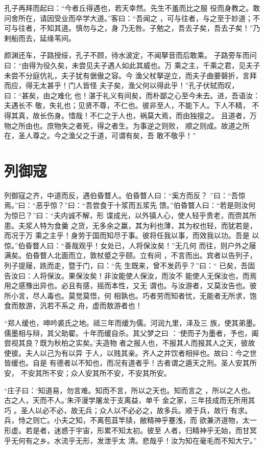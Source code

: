 \documentclass[12pt,UTF8]{ctexbook}
\begin{document}
孔子再拜而起曰：“今者丘得遇也，若天幸然。先生不羞而比之服 役而身教之。敢问舍所在，请因受业而卒学大道。”客曰：“吾闻之 ，可与往者，与之至于妙道；不可与往者，不知其道。慎勿与之，身 乃无咎。子勉之，吾去子矣，吾去子矣！”乃剌船而去，延缘苇间。

颜渊还车，子路授绥，孔子不顾，待水波定，不闻拏音而后敢乘。 子路旁车而问曰：“由得为役久矣，未尝见夫子遇人如此其威也。万 乘之主，千乘之君，见夫子未尝不分庭伉礼，夫子犹有倨傲之容。今 渔父杖拏逆立，而夫子曲要磬折，言拜而应，得无太甚乎！门人皆怪 夫子矣，渔父何以得此乎！”孔子伏轼而叹，曰：“甚矣，由之难化 也！湛于礼义有间矣，而朴鄙之心至今未去。进，吾语汝：夫遇长不 敬，失礼也；见贤不尊，不仁也。彼非至人，不能下人。下人不精， 不得其真，故长伤身。惜哉！不仁之于人也，祸莫大焉，而由独擅之。 且道者，万物之所由也。庶物失之者死，得之者生。为事逆之则败， 顺之则成。故道之所在，圣人尊之。今之渔父之于道，可谓有矣，吾 敢不敬乎！”
\section{列御寇}

列御寇之齐，中道而反，遇伯昏瞀人。伯昏瞀人曰：“奚方而反？ ”曰：“吾惊焉。”曰：“恶乎惊？”曰：“吾尝食于十浆而五浆先 馈。”伯昏瞀人曰：“若是则汝何为惊已？”曰：“夫内诚不解，形 谍成光，以外镇人心，使人轻乎贵老，而赍其所患。夫浆人特为食羹 之货，无多余之赢，其为利也薄，其为权也轻，而犹若是，而况于万 乘之主乎！身劳于国而知尽于事。彼将任我以事，而效我以功。吾是 以惊。”伯昏瞀人曰：“善哉观乎！女处已，人将保汝矣！”无几何 而往，则户外之屦满矣。伯昏瞀人北面而立，敦杖蹙之乎颐。立有间 ，不言而出。宾者以告列子，列子提屦，跣而走，暨于门，曰：“先 生既来，曾不发药乎？”曰：“ 已矣，吾固告汝曰：人将保汝。果保汝矣！非汝能使人保汝，而汝不 能使人无保汝也，而焉用之感豫出异也。必且有感，摇而本性，又无 谓也。与汝游者，又莫汝告也。彼所小言，尽人毒也。莫觉莫悟，何 相孰也。巧者劳而知者忧，无能者无所求，饱食而敖游，汎若不系之 舟，虚而敖游者也！

“郑人缓也，呻吟裘氏之地。祗三年而缓为儒。河润九里，泽及三 族，使其弟墨。儒墨相与辩，其父助翟。十年而缓自杀。其父梦之曰 ：‘使而子为墨者，予也，阖尝视其良？既为秋柏之实矣。’夫造物 者之报人也，不报其人而报其人之天，彼故使彼。夫人以己为有以异 于人，以贱其亲。齐人之井饮者相捽也。故曰：今之世皆缓也。自是 有德者以不知也，而况有道者乎！古者谓之遁天之刑。圣人安其所安， 不安其所不安；众人安其所不安，不安其所安。

“庄子曰：‘知道易，勿言难。知而不言，所以之天也。知而言之 ，所以之人也。古之人，天而不人。’朱泙漫学屠龙于支离益，单千 金之家，三年技成而无所用其巧 。圣人以必不必，故无兵；众人以不必必之，故多兵。顺于兵，故行 有求。兵，恃之则亡。小夫之知，不离苞苴竿牍，敝精神乎蹇浅，而 欲兼济道物，太一形虚。若是者，迷惑于宇宙，形累不知太初。彼至 人者，归精神乎无始，而甘冥乎无何有之乡。水流乎无形，发泄乎太 清。悲哉乎！汝为知在毫毛而不知大宁。”
\end{document}

